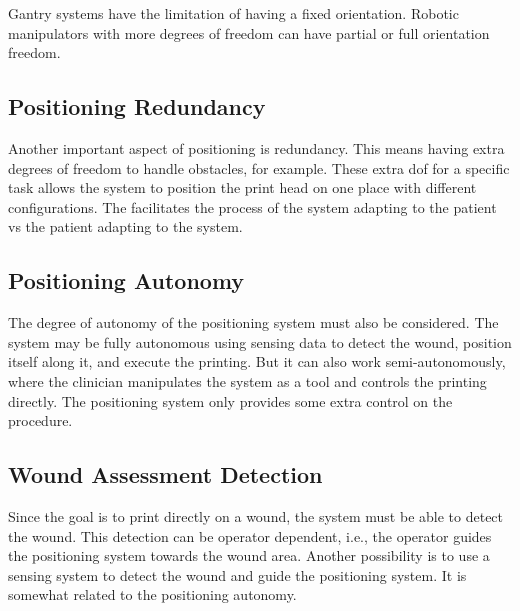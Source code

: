 Gantry systems have the limitation of having a fixed orientation. Robotic manipulators with more degrees of freedom can have partial or full orientation freedom.


\subsection{Positioning Redundancy}
\label{subsec:system_architecture_requirements_positioning_redundancy}

Another important aspect of positioning is redundancy. This means having extra degrees of freedom to handle obstacles, for example. These extra \gls{dof} for a specific task allows the system to position the print head on one place with different configurations. The facilitates the process of the system adapting to the patient vs the patient adapting to the system.


\subsection{Positioning Autonomy}
\label{subsec:system_architecture_requirements_positioning_autonomy}

The degree of autonomy of the positioning system must also be considered. The system may be fully autonomous using sensing data to detect the wound, position itself along it, and execute the printing. But it can also work semi-autonomously, where the clinician manipulates the system as a tool and controls the printing directly. The positioning system only provides some extra control on the procedure.


\subsection{Wound Assessment Detection}
\label{subsec:system_architecture_requirements_wound_assessment_detection}

Since the goal is to print directly on a wound, the system must be able to detect the wound. This detection can be operator dependent, i.e., the operator guides the positioning system towards the wound area. Another possibility is to use a sensing system to detect the wound and guide the positioning system. It is somewhat related to the positioning autonomy.

